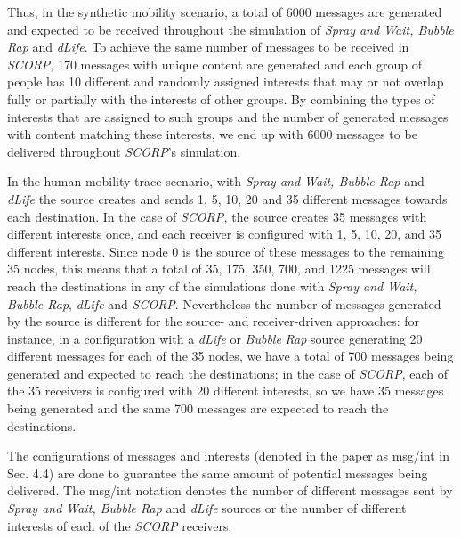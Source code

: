 \documentclass[lnicst]{svmultln}
\begin{document}
Thus, in the synthetic mobility scenario, a total of 6000 messages
are generated and expected to be received throughout the simulation
of \emph{Spray and Wait, Bubble Rap }and\emph{ dLife}. To achieve
the same number of messages to be received in \emph{SCORP}, 170 messages
with unique content are generated and each group of people has 10
different and randomly assigned interests that may or not overlap
fully or partially with the interests of other groups. By combining
the types of interests that are assigned to such groups and the number
of generated messages with content matching these interests, we end
up with 6000 messages to be delivered throughout \emph{SCORP}'s simulation.

In the human mobility trace scenario, with\emph{ Spray and Wait, Bubble
Rap }and\emph{ dLife} the source creates and sends 1, 5, 10, 20 and
35 different messages towards each destination. In the case of \emph{SCORP,
}the source creates 35 messages with different interests once, and
each receiver is configured with 1, 5, 10, 20, and 35 different interests.
Since node 0 is the source of these messages to the remaining 35 nodes,
this means that a total of 35, 175, 350, 700, and 1225 messages will
reach the destinations in any of the simulations done with \emph{Spray
and Wait, Bubble Rap},\emph{ dLife} and \emph{SCORP}. Nevertheless
the number of messages generated by the source is different for the
source- and receiver-driven approaches: for instance, in a configuration
with a \emph{dLife} or \emph{Bubble} \emph{Rap} source generating
20 different messages for each of the 35 nodes, we have a total of
700 messages being generated and expected to reach the destinations;
in the case of \emph{SCORP}, each of the 35 receivers is configured
with 20 different interests, so we have 35 messages being generated
and the same 700 messages are expected to reach the destinations.

The configurations of messages and interests (denoted in the paper
as msg/int in Sec. 4.4) are done to guarantee the same amount of potential
messages being delivered. The msg/int notation denotes the number
of different messages sent by \emph{Spray and Wait, Bubble Rap }and\emph{
dLife} sources or the number of different interests of each of the
\emph{SCORP} receivers.
\end{document}
